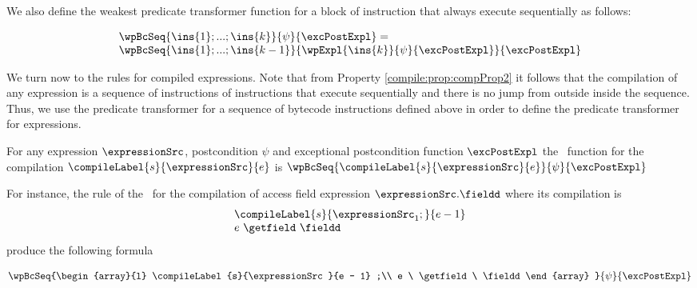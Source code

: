 We also define the weakest predicate transformer function  for a block of instruction that always execute sequentially as follows:

\begin{wpSeq}\label{pog:wpBc:wpSeq}
     $$ \begin{array}{l} 
              \wpBcSeq{ \ins{1};...;\ins{k}}{ \psi  } { \excPostExpl } =\\
              \wpBcSeq{\ins{1};...;\ins{k -1} }{ \wpExpl{ \ins{k} }{ \psi }{ \excPostExpl} }{\excPostExpl} 
        \end{array}$$ 

\end{wpSeq}



We turn now to the rules for compiled expressions. Note that from Property \ref{compile:prop:compProp2} it follows that 
the compilation of any expression is a sequence of instructions of instructions that execute sequentially and there is no jump from outside inside 
the sequence. Thus, we use 
the predicate transformer  for a sequence of bytecode instructions defined above in order to define 
the predicate transformer for  expressions. 

\begin{wpExpr} \label{wpExpr}
               For any expression $\expressionSrc$, postcondition $\psi$ and exceptional postcondition function
               $\excPostExpl$ the \wpName \ function for the compilation $\compileLabel{s}{\expressionSrc}{e}$  is
               $ \wpBcSeq{\compileLabel{s}{\expressionSrc}{e} }{ \psi  } { \excPostExpl }  $
 \end{wpExpr}

For instance, the  rule of the \wpName  \ for the compilation of access  field expression $\expressionSrc.\fieldd $ 
where its compilation is 
$$\begin{array}{l}
    \compileLabel{s}{ \expressionSrc_1;}{e - 1}\\
     e \ \getfield \ \fieldd \\
 \end{array}
$$
  produce the following formula 
 
$$  \wpBcSeq{\begin{array}{l}
	              \compileLabel{s}{\expressionSrc }{e - 1} ;\\
	              e \ \getfield \ \fieldd 
	           \end{array} }{ \psi  } { \excPostExpl } $$	

